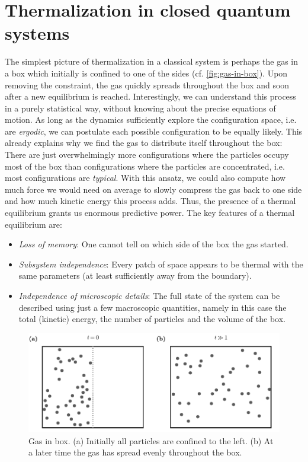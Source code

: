 \section{Thermalization in closed quantum systems}
\label{sec:Thermalization-in-closed-QS}
The simplest picture of thermalization in a classical system is perhaps the gas in a box which initially is confined to one of the sides (cf. \autoref{fig:gas-in-box}). Upon removing the constraint, the gas quickly spreads throughout the box and soon after a new equilibrium is reached. Interestingly, we can understand this process in a purely statistical way, without knowing about the precise equations of motion. As long as the dynamics sufficiently explore the configuration space, i.e. are \emph{ergodic}, we can postulate each possible configuration to be equally likely. This already explains why we find the gas to distribute itself throughout the box: There are just overwhelmingly more configurations where the particles occupy most of the box than configurations where the particles are concentrated, i.e. most configurations are \emph{typical}. With this ansatz, we could also compute how much force we would need on average to slowly compress the gas back to one side and how much kinetic energy this process adds. Thus, the presence of a thermal equilibrium grants us enormous predictive power.
The key features of a thermal equilibrium are:
\begin{itemize}
	\item \emph{Loss of memory}: One cannot tell on which side of the box the gas started.
	\item \emph{Subsystem independence}: Every patch of space appears to be thermal with the same parameters (at least sufficiently away from the boundary).
	\item \emph{Independence of microscopic details}: The full state of the system can be described using just a few macroscopic quantities, namely in this case the total (kinetic) energy, the number of particles and the volume of the box.
\end{itemize}

\begin{figure}[htb]
	\centering
	\includegraphics[]{gfx/part1/gas-in-box-bw}
	\caption{Gas in box. (a) Initially all particles are confined to the left. (b) At a later time the gas has spread evenly throughout the box.}
	\label{fig:gas-in-box}
\end{figure}

